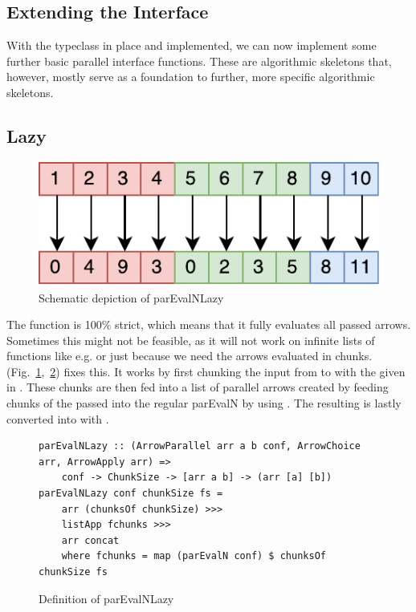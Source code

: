 \subsection{Extending the Interface}
\label{sec:extending-interface}
With the  typeclass in place and implemented, we can now implement some further basic parallel interface functions. These are algorithmic skeletons that, however, mostly serve as a foundation to further, more specific algorithmic skeletons.

\subsection{Lazy }
\begin{figure}[h]
	\includegraphics[scale=0.7]{images/parEvalNLazy}
	\caption{Schematic depiction of parEvalNLazy}
	\label{fig:parEvalNLazyImg}
\end{figure}
The function  is 100\% strict, which means that it fully evaluates all passed arrows. Sometimes this might not be feasible, as it will not work on infinite lists of functions like e.g.  or just because we need the arrows evaluated in chunks.  (Fig.~\ref{fig:parEvalNLazyImg},~\ref{fig:parEvalNLazy}) fixes this. It works by first chunking the input from \code{[a]} to \code{[[a]]} with the given  in . These chunks are then fed into a list \code{[arr [a] [b]]} of parallel arrows created by feeding chunks of the passed  into the regular parEvalN by using . The resulting \code{[[b]]} is lastly converted into \code{[b]} with .
\begin{figure}[h]
\begin{lstlisting}[frame=htrbl]
parEvalNLazy :: (ArrowParallel arr a b conf, ArrowChoice arr, ArrowApply arr) =>
	conf -> ChunkSize -> [arr a b] -> (arr [a] [b])
parEvalNLazy conf chunkSize fs =
	arr (chunksOf chunkSize) >>>
	listApp fchunks >>>
	arr concat
	where fchunks = map (parEvalN conf) $ chunksOf chunkSize fs
\end{lstlisting} %
\caption{Definition of parEvalNLazy}
\label{fig:parEvalNLazy}
\end{figure}

